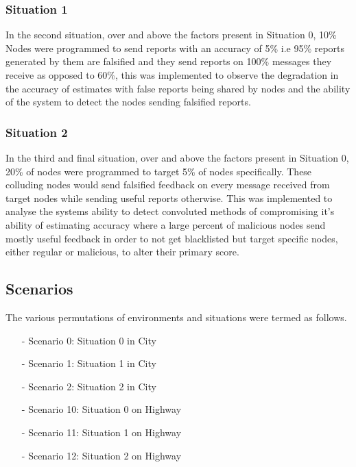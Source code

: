 \documentclass[journal]{IEEEtran}
\begin{document}
\subsubsection{Situation 1}
\label{sec:Experiments:sit1}
In the second situation, over and above the factors present in Situation 0, 10\% Nodes were programmed to send reports with an accuracy of 5\% i.e 95\% reports generated by them are falsified and they send reports on 100\% messages they receive as opposed to 60\%, this was implemented to observe the degradation in the accuracy of estimates with false reports being shared by nodes and the ability of the system to detect the nodes sending falsified reports.
\subsubsection{Situation 2}
\label{sec:Experiments:sit2}
In the third and final situation, over and above the factors present in Situation 0, 20\% of nodes were programmed to target 5\% of nodes specifically. These colluding nodes would send falsified feedback on every message received from target nodes while sending useful reports otherwise. This was implemented to analyse the systems ability to detect convoluted methods of compromising it's ability of estimating accuracy where a large percent of malicious nodes send mostly useful feedback in order to not get blacklisted but target specific nodes, either regular or malicious, to alter their primary score.
\subsection{Scenarios}
The various permutations of environments and situations were termed as follows.
\begin{itemize}
	\item[-] Scenario 0: Situation 0 in City
	\item[-] Scenario 1: Situation 1 in City
	\item[-] Scenario 2: Situation 2 in City
	\item[-] Scenario 10: Situation 0 on Highway
	\item[-] Scenario 11: Situation 1 on Highway
	\item[-] Scenario 12: Situation 2 on Highway
\end{itemize}
\end{document}
